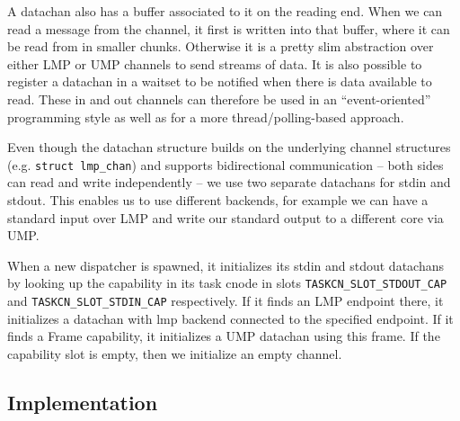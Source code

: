 A datachan also has a buffer associated to it on the reading end. When we can read a message from
the channel, it first is written into that buffer, where it can be read from in smaller chunks. Otherwise it is a pretty slim abstraction over either LMP or UMP channels to send streams of data.
It is also possible to register a datachan in a waitset to be notified when there is data available to read. These in and out channels can therefore be used in an ``event-oriented'' programming style
as well as for a more thread/polling-based approach.

Even though the datachan structure builds on the underlying channel structures (e.g. \lstinline{struct lmp_chan}) and supports bidirectional communication -- both sides can read
and write independently -- we use two separate datachans for stdin and stdout. This enables us
to use different backends, for example we can have a standard input over LMP and write our standard output to a different core via UMP.

When a new dispatcher is spawned, it initializes its stdin and stdout datachans by looking up
the capability in its task cnode in slots
\lstinline{TASKCN_SLOT_STDOUT_CAP} and \lstinline{TASKCN_SLOT_STDIN_CAP} respectively.
If it finds an LMP endpoint there, it initializes a datachan with lmp backend connected to
the specified endpoint. If it finds a Frame capability, it initializes a UMP datachan using this
frame. If the capability slot is empty, then we initialize an empty channel.



\subsection{Implementation}


